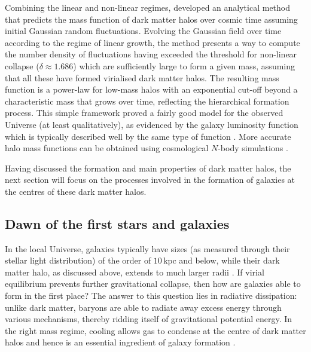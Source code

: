 Combining the linear and non-linear regimes, \citet{1974ApJ...187..425P} developed an analytical method that predicts the mass function of dark matter halos over cosmic time assuming initial Gaussian random fluctuations. Evolving the Gaussian field over time according to the regime of linear growth, the method presents a way to compute the number density of fluctuations having exceeded the threshold for non-linear collapse ($\delta \approx 1.686$) which are sufficiently large to form a given mass, assuming that all these have formed virialised dark matter halos. The resulting mass function is a power-law for low-mass halos with an exponential cut-off beyond a characteristic mass that grows over time, reflecting the hierarchical formation process. This simple framework proved a fairly good model for the observed Universe (at least qualitatively), as evidenced by the galaxy luminosity function which is typically described well by the same type of function \citep[][]{1976ApJ...203..297S}. More accurate halo mass functions can be obtained using cosmological $N$-body simulations \citep[e.g.][]{2008ApJ...688..709T}.

Having discussed the formation and main properties of dark matter halos, the next section will focus on the processes involved in the formation of galaxies at the centres of these dark matter halos.

\subsection{Dawn of the first stars and galaxies}
\label{chIssec:Galaxy_formation}

In the local Universe, galaxies typically have sizes (as measured through their stellar light distribution) of the order of $10 \, \mathrm{kpc}$ and below, while their dark matter halo, as discussed above, extends to much larger radii \citep[e.g.][]{2013ApJ...764L..31K}. If virial equilibrium prevents further gravitational collapse, then how are galaxies able to form in the first place? The answer to this question lies in radiative dissipation: unlike dark matter, baryons are able to radiate away excess energy through various mechanisms, thereby ridding itself of gravitational potential energy. In the right mass regime, cooling allows gas to condense at the centre of dark matter halos and hence is an essential ingredient of galaxy formation \citep{1977ApJ...211..638S, 1977MNRAS.179..541R, 1977ApJ...215..483B, 1978MNRAS.183..341W}.

